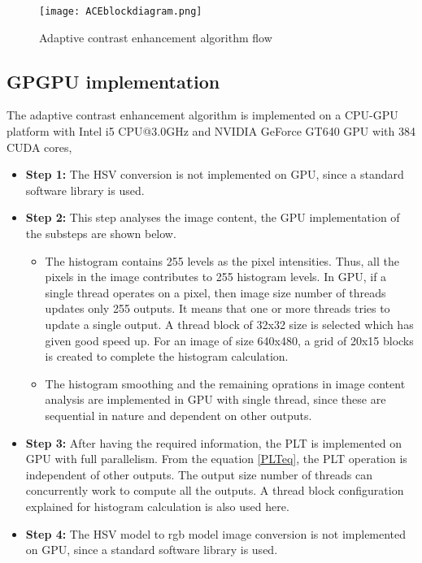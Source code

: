 \begin{figure}[htb]
	\centering
	\texttt{[image: ACEblockdiagram.png]}
	\caption{Adaptive contrast enhancement algorithm flow}
	\label{ACE}
\end{figure}
\subsection{GPGPU implementation}
The adaptive contrast enhancement algorithm is implemented on a CPU-GPU platform with Intel i5 CPU@3.0GHz and NVIDIA GeForce GT640 GPU with 384 CUDA cores,
\begin{itemize}		
		\item{\textbf{Step 1:}} The HSV conversion is not implemented on GPU, since a standard software library is used.
		\item{\textbf{Step 2:}} This step analyses the image content, the GPU implementation of the substeps are shown below.
		\begin{itemize}
			\item The histogram contains 255 levels as the pixel intensities. Thus, all the pixels in the image contributes to 255 histogram levels. In GPU, if a single thread operates on a pixel, then image size number of threads updates only 255 outputs. It means that one or more threads tries to update a single output. A thread block of 32x32 size is selected which has given good speed up. For an image of size 640x480, a grid of 20x15 blocks is created to complete the histogram calculation.	
			\item The histogram smoothing and the remaining oprations in image content analysis are implemented in GPU with single thread, since these are sequential in nature and dependent on other outputs.			
		\end{itemize}
		\item{\textbf{Step 3:}} After having the required information, the PLT is implemented on GPU with full parallelism. From the equation \ref{PLTeq}, the PLT operation is independent of other outputs. The output size number of threads can concurrently work to compute all the outputs. A thread block configuration explained for histogram calculation is also used here.
		 \item{\textbf{Step 4:}} The HSV model to rgb model image conversion is not implemented on GPU, since a standard software library is used.
\end{itemize}
